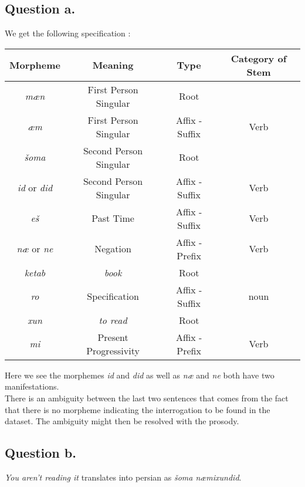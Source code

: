 \documentclass{Cours}
\begin{document}
\subsection{Question a.}\label{3a}
We get the following specification :
\begin{center}
    \begin{tabular}{cccc}
        \toprule
        Morpheme                    & Meaning                & Type           & Category of Stem \\
        \midrule
        \textsl{mæn}                & First Person Singular  & Root           &                  \\
        \textsl{æm}                 & First Person Singular  & Affix - Suffix & Verb             \\
        \textsl{šoma}               & Second Person Singular & Root           &                  \\
        \textsl{id} or \textsl{did} & Second Person Singular & Affix - Suffix & Verb             \\
        \textsl{eš}                 & Past Time              & Affix - Suffix & Verb             \\
        \textsl{næ} or \textsl{ne}  & Negation               & Affix - Prefix & Verb             \\
        \textsl{ketab}              & \textsl{book}          & Root           &                  \\
        \textsl{ro}                 & Specification          & Affix - Suffix & noun             \\
        \textsl{xun}                & \textsl{to read}       & Root           &                  \\
        \textsl{mi}                 & Present Progressivity  & Affix - Prefix & Verb             \\
        \bottomrule
    \end{tabular}
\end{center}

Here we see the morphemes \textsl{id} and \textsl{did} as well as \textsl{næ} and \textsl{ne} both have two manifestations.\\
There is an ambiguity between the last two sentences that comes from the fact that there is no morpheme indicating the interrogation to be found in the dataset. The ambiguity might then be resolved with the prosody.

\subsection{Question b.}
\textsl{You aren't reading it} translates into persian as \textsl{šoma næmixundid}.
\end{document}
